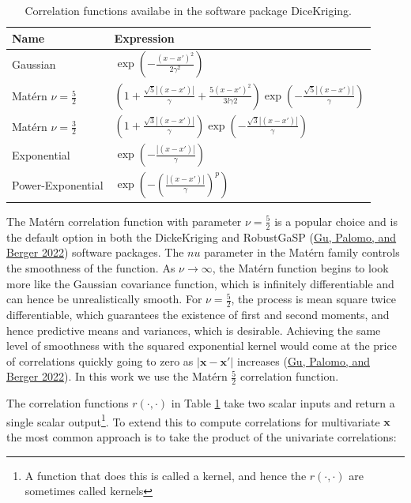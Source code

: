 \documentclass[
  12pt,
  a4paper,
  twoside]{book}
\begin{document}
\begin{table}\centering
\caption{Correlation functions availabe in the software package DiceKriging.}
\label{tab:kernels}
\begin{tabular}{|l|l|}
\hline
\textbf{Name} & \textbf{Expression} \\
\hline
Gaussian & $\exp(- \frac{(x - x')^2}{2\gamma^2})$\\
Matérn  $\nu = \frac{5}{2}$ & $\left( 1 + \frac{\sqrt{5}|(x - x')|}{\gamma} + \frac{5(x - x')^2}{3l\gamma2}\right)\exp\left(-\frac{\sqrt{5}|(x - x')|}{\gamma} \right)$ \\
Matérn $\nu = \frac{3}{2}$ &$\left( 1 + \frac{\sqrt{3}|(x - x')|}{\gamma}\right)\exp(-\frac{\sqrt{3}|(x - x')|}{\gamma})$\\
Exponential & $\exp\left(-\frac{|(x - x')|}{\gamma} \right)$\\
Power-Exponential & $\exp\left(-\left(\frac{|(x - x')|}{\gamma}\right)^p\right)$\\
\hline
\end{tabular}
\end{table}

The Matérn correlation function with parameter \(\nu = \frac{5}{2}\) is a popular choice and is the default option in both the DickeKriging and RobustGaSP (\protect\hyperlink{ref-rgasp_manual}{Gu, Palomo, and Berger 2022}) software packages. The \(nu\) parameter in the Matérn family controls the smoothness of the function. As \(\nu \rightarrow \infty\), the Matérn function begins to look more like the Gaussian covariance function, which is infinitely differentiable and can hence be unrealistically smooth. For \(\nu = \frac{5}{2}\), the process is mean square twice differentiable, which guarantees the existence of first and second moments, and hence predictive means and variances, which is desirable. Achieving the same level of smoothness with the squared exponential kernel would come at the price of correlations quickly going to zero as \(|\mathbf{x} - \mathbf{x'}|\) increases (\protect\hyperlink{ref-rgasp_manual}{Gu, Palomo, and Berger 2022}). In this work we use the Matérn \(\frac{5}{2}\) correlation function.

The correlation functions \(r(\cdot, \cdot)\) in Table \ref{tab:kernels} take two scalar inputs and return a single scalar output\footnote{A function that does this is called a kernel, and hence the \(r(\cdot, \cdot)\) are sometimes called kernels}. To extend this to compute correlations for multivariate \(\mathbf{x}\) the most common approach is to take the product of the univariate correlations:
\end{document}
